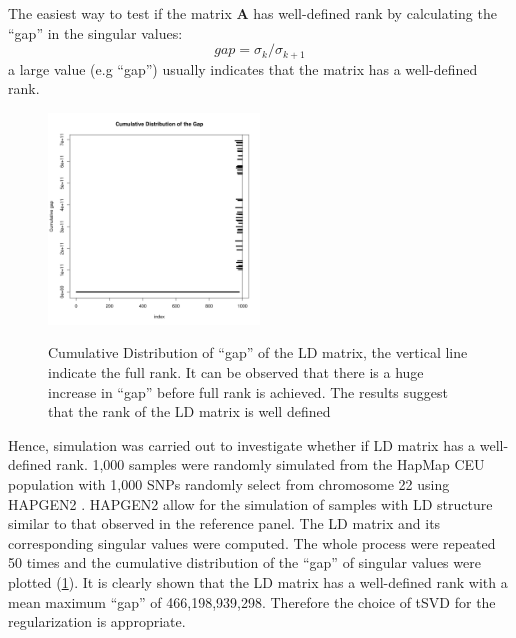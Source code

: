 			The easiest way to test if the matrix $\boldsymbol{A}$ has well-defined rank by calculating the ``gap'' in the singular values:
			\begin{equation}
			gap = \sigma_k/\sigma_{k+1}
			\label{eq:gapSingular}
			\end{equation}
			a large value (e.g ``gap'') usually indicates that the matrix has a well-defined rank.
			\begin{figure}
				\caption[Cumulative Distribution of ``gap'' of the LD matrix]{Cumulative Distribution of ``gap'' of the LD matrix, the vertical line indicate the full rank. It can be observed that there is a huge increase in ``gap'' before full rank is achieved. 
				The results suggest that the rank of the LD matrix is well defined}
				\centering
				\includegraphics[width=0.5\textwidth]{figure/singular_value_distribution.png}
				\label{fig:singularValueDist}
				\vspace{-20pt}
			\end{figure}
			
			Hence, simulation was carried out to investigate whether if \gls{LD} matrix has a well-defined rank.
			1,000 samples were randomly simulated from the HapMap \citep{Altshuler2010} \gls{CEU} population with 1,000 \glspl{SNP} randomly select from chromosome 22 using HAPGEN2 \citep{Su2011}.
			HAPGEN2 allow for the simulation of samples with \gls{LD} structure similar to that observed in the reference panel.
			The \gls{LD} matrix and its corresponding singular values were computed. 
			The whole process were repeated 50 times and the cumulative distribution of the ``gap'' of singular values were plotted (\cref{fig:singularValueDist}). 
			It is clearly shown that the \gls{LD} matrix has a well-defined rank with a mean maximum ``gap'' of 466,198,939,298.
			Therefore the choice of \gls{tSVD} for the regularization is appropriate.
			

